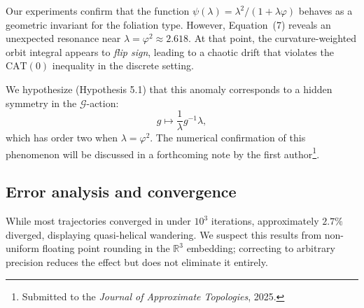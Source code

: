 \documentclass{amsart}
\begin{document}
Our %
experiments confirm that the function $\psi(\lambda) = \lambda^2 / (1+\lambda\varphi)$ behaves as a geometric invariant for the foliation type.  
However, Equation~(7) reveals %
an unexpected %
resonance near $\lambda = \varphi^2 \approx 2.618$.  
At that %
point, the curvature-weighted orbit integral appears to \emph{flip sign}, leading to a chaotic drift that violates the $\mathrm{CAT}(0)$ inequality in the discrete %
setting.

We hypothesize (Hypothesis 5.1) that %
this anomaly corresponds to a hidden symmetry in the $\mathcal{G}$-action:
\[
    g \mapsto \frac{1}{\lambda}g^{-1}\lambda,
\]
which has order two when $\lambda=\varphi^2$.  
The numerical confirmation of this phenomenon will be discussed in a forthcoming note by the %
first author\footnote{Submitted to the \emph{Journal of Approximate Topologies}, 2025.}.  

\subsection{Error analysis and convergence}

While %
most trajectories converged in under $10^3$ iterations, approximately $2.7\%$ diverged, displaying quasi-helical wandering.  
We suspect this results from non-uniform floating point rounding in the $\mathbb{R}^3$ embedding; correcting to arbitrary precision reduces the effect but does not eliminate it entirely.
\end{document}
